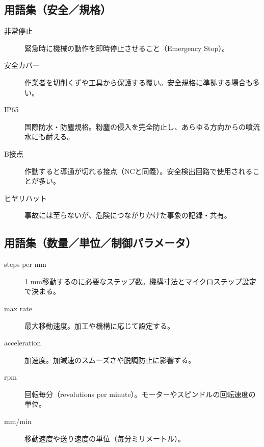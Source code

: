\documentclass[uplatex,dvipdfmx]{ujarticle}
\begin{document}
\subsection*{用語集（安全／規格）}
\begin{description}
  \item[非常停止] 緊急時に機械の動作を即時停止させること（Emergency Stop）。
  \item[安全カバー] 作業者を切削くずや工具から保護する覆い。安全規格に準拠する場合も多い。
  \item[IP65] 国際防水・防塵規格。粉塵の侵入を完全防止し、あらゆる方向からの噴流水にも耐える。
  \item[B接点] 作動すると導通が切れる接点（NCと同義）。安全検出回路で使用されることが多い。
  \item[ヒヤリハット] 事故には至らないが、危険につながりかけた事象の記録・共有。
\end{description}

\subsection*{用語集（数量／単位／制御パラメータ）}
\begin{description}
  \item[steps per mm] 1 mm移動するのに必要なステップ数。機構寸法とマイクロステップ設定で決まる。
  \item[max rate] 最大移動速度。加工や機構に応じて設定する。
  \item[acceleration] 加速度。加減速のスムーズさや脱調防止に影響する。
  \item[rpm] 回転毎分（revolutions per minute）。モーターやスピンドルの回転速度の単位。
  \item[mm/min] 移動速度や送り速度の単位（毎分ミリメートル）。
\end{description}
\end{document}
